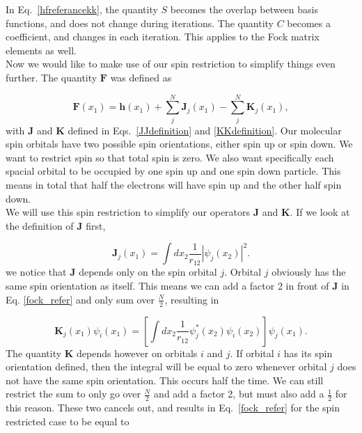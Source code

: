 \documentclass[a4paper,norsk,11pt,twoside]{report}
\begin{document}
In Eq.~\eqref{hfreferancekk}, the quantity $S$ becomes the overlap
between basis functions, and does not change during iterations. The quantity $C$
becomes a coefficient, and changes in each iteration. This applies to the Fock
matrix elements as well. \\

Now we would like to make use of our spin restriction to simplify things even further. The quantity $\textbf{F}$ was defined as

\begin{equation}
\textbf{F}(x_1) = \textbf{h}(x_1)  + \sum_j^N \textbf{J}_j(x_1) - \sum_j^N \textbf{K}_j(x_1) , \label{fock_refer}
\end{equation}
with $\textbf{J}$ and $\textbf{K}$ defined in
Eqs.~\eqref{JJdefinition} and \eqref{KKdefinition}. Our molecular spin
orbitals have two possible spin orientations, either spin up or spin down. We want to
restrict spin so that total spin is zero. We also want specifically
each spacial orbital to be occupied by one spin up and one spin down
particle. This means in total that half the electrons will have spin up and
the other half spin down. \\

We will use this spin restriction to simplify our operators $\textbf{J}$ and $\textbf{K}$. If we look at the definition of $\textbf{J}$ first,

\begin{equation}
\textbf{J}_j(x_1) = \int dx_2
\frac{1}{r_{12}} |\psi_j(x_2)|^2 . \label{Jdefinition}
\end{equation}
we notice that $\textbf{J}$ depends only on the spin orbital $j$. Orbital $j$ obviously 
has the same spin orientation as itself. This means we can add a factor 2 in front of $\textbf{J}$ in Eq. \eqref{fock_refer} and only sum over $\frac{N}{2}$, resulting in

\begin{equation}
\textbf{K}_j(x_1) \psi_i(x_1) =
\left[ \int dx_2 \frac{1}{r_{12}} \psi_j^*(x_2) \psi_i(x_2) \right] \psi_j(x_1) .
\label{Kdefinition}
\end{equation}
The quantity $\textbf{K}$ depends however on orbitals $i$ and $j$. If
orbital $i$ has its spin orientation defined, then the integral will
be equal to zero whenever orbital $j$ does not have the same spin
orientation. This occurs half the time. We can still restrict the sum
to only go over $\frac{N}{2}$ and add a factor 2, but must also add a
$\frac{1}{2}$ for this reason. These two cancels out, and results in 
Eq.~\eqref{fock_refer} for the spin restricted case
to be equal to 
\end{document}

